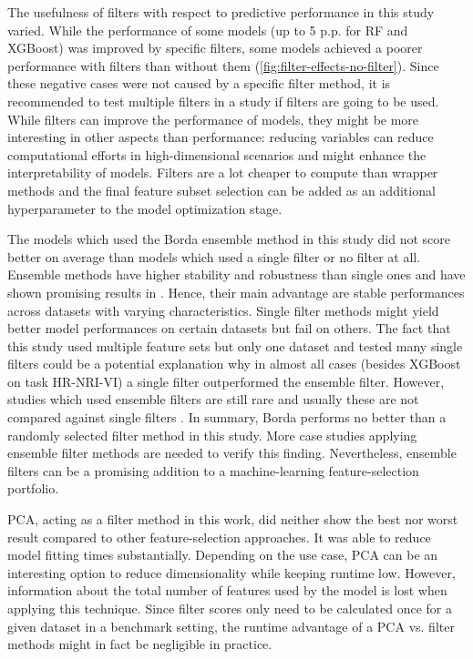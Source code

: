 \documentclass[letterpaper, peerreview, draftcls]{IEEEtran}
\begin{document}
The usefulness of filters with respect to predictive performance in this study varied.
While the performance of some models (up to 5 p.p. for RF and XGBoost) was improved by specific filters, some models achieved a poorer performance with filters than without them (\autoref{fig:filter-effects-no-filter}).
Since these negative cases were not caused by a specific filter method, it is recommended to test multiple filters in a study if filters are going to be used.
While filters can improve the performance of models, they might be more interesting in other aspects than performance: reducing variables can reduce computational efforts in high-dimensional scenarios and might enhance the interpretability of models.
Filters are a lot cheaper to compute than wrapper methods and the final feature subset selection can be added as an additional hyperparameter to the model optimization stage.

The models which used the Borda ensemble method in this study did not score better on average than models which used a single filter or no filter at all.
Ensemble methods have higher stability and robustness than single ones and have shown promising results in \cite{drotar2017a}.
Hence, their main advantage are stable performances across datasets with varying characteristics.
Single filter methods might yield better model performances on certain datasets but fail on others.
The fact that this study used multiple feature sets but only one dataset and tested many single filters could be a potential explanation why in almost all cases (besides XGBoost on task HR-NRI-VI) a single filter outperformed the ensemble filter.
However, studies which used ensemble filters are still rare and usually these are not compared against single filters \cite{ghosh2019}.
In summary, Borda performs no better than a randomly selected filter method in this study.
More case studies applying ensemble filter methods are needed to verify this finding.
Nevertheless, ensemble filters can be a promising addition to a machine-learning feature-selection portfolio.

PCA, acting as a filter method in this work, did neither show the best nor worst result compared to other feature-selection approaches.
It was able to reduce model fitting times substantially.
Depending on the use case, PCA can be an interesting option to reduce dimensionality while keeping runtime low.
However, information about the total number of features used by the model is lost when applying this technique.
Since filter scores only need to be calculated once for a given dataset in a benchmark setting, the runtime advantage of a PCA vs. filter methods might in fact be negligible in practice.
\end{document}
